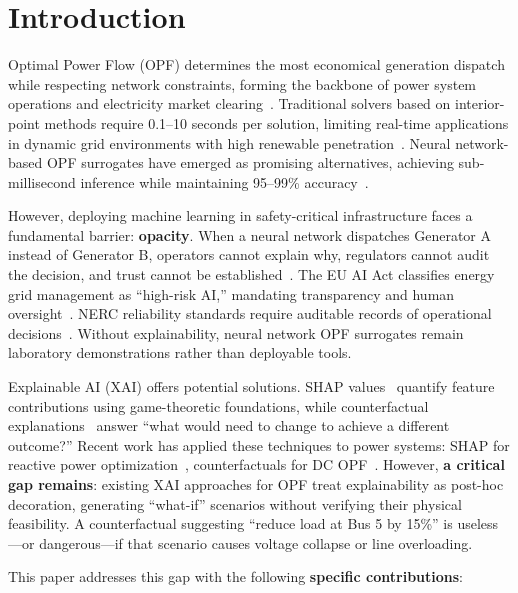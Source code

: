 \documentclass[journal,12pt,onecolumn]{IEEEtran}
\begin{document}
\section{Introduction}
\label{sec:introduction}

Optimal Power Flow (OPF) determines the most economical generation dispatch while respecting network constraints, forming the backbone of power system operations and electricity market clearing~\cite{ref1}. Traditional solvers based on interior-point methods require 0.1--10 seconds per solution, limiting real-time applications in dynamic grid environments with high renewable penetration~\cite{ref2}. Neural network-based OPF surrogates have emerged as promising alternatives, achieving sub-millisecond inference while maintaining 95--99\% accuracy~\cite{ref8}.

However, deploying machine learning in safety-critical infrastructure faces a fundamental barrier: \textbf{opacity}. When a neural network dispatches Generator A instead of Generator B, operators cannot explain why, regulators cannot audit the decision, and trust cannot be established~\cite{ref3}. The EU AI Act classifies energy grid management as ``high-risk AI,'' mandating transparency and human oversight~\cite{ref25}. NERC reliability standards require auditable records of operational decisions~\cite{ref26}. Without explainability, neural network OPF surrogates remain laboratory demonstrations rather than deployable tools.

Explainable AI (XAI) offers potential solutions. SHAP values~\cite{ref6} quantify feature contributions using game-theoretic foundations, while counterfactual explanations~\cite{ref7} answer ``what would need to change to achieve a different outcome?'' Recent work has applied these techniques to power systems: SHAP for reactive power optimization~\cite{ref12}, counterfactuals for DC OPF~\cite{ref14}. However, \textbf{a critical gap remains}: existing XAI approaches for OPF treat explainability as post-hoc decoration, generating ``what-if'' scenarios without verifying their physical feasibility. A counterfactual suggesting ``reduce load at Bus 5 by 15\%'' is useless---or dangerous---if that scenario causes voltage collapse or line overloading.

This paper addresses this gap with the following \textbf{specific contributions}:
\end{document}
